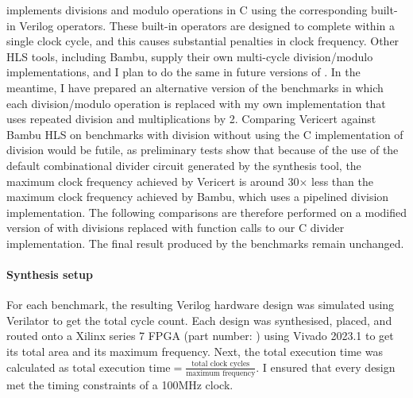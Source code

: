 \vericert{} implements divisions and modulo operations in C using the
corresponding built-in Verilog operators. These built-in operators are designed
to complete within a single clock cycle, and this causes substantial penalties
in clock frequency.  Other HLS tools, including Bambu, supply their own
multi-cycle division/modulo implementations, and I plan to do the same in future
versions of \vericert{}.  In the meantime, I have prepared an alternative
version of the benchmarks in which each division/modulo operation is replaced
with my own implementation that uses repeated division and multiplications by 2.
Comparing Vericert against Bambu HLS on benchmarks with division without using
the C implementation of division would be futile, as preliminary tests show that
because of the use of the default combinational divider circuit generated by the
synthesis tool, the maximum clock frequency achieved by Vericert is around
30$\times$ less than the maximum clock frequency achieved by Bambu, which uses a
pipelined division implementation.  The following comparisons are therefore
performed on a modified version of \polybench{} with divisions replaced with
function calls to our C divider implementation.  The final result produced by
the benchmarks remain unchanged.

\paragraph{Synthesis setup} For each benchmark, the resulting Verilog hardware
design was simulated using Verilator to get the total cycle count.  Each design
was synthesised, placed, and routed onto a Xilinx series 7 FPGA (part number:
) using Vivado 2023.1 to get its total area and its
maximum frequency.  Next, the total execution time was calculated as
$\text{total execution time} = \frac{\text{total clock cycles}}{\text{maximum
    frequency}}$.  I ensured that every design met the timing constraints of a
100MHz clock.



